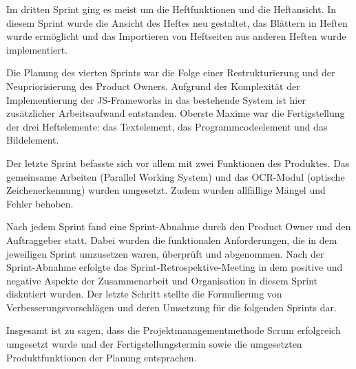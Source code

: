 
\newpage

Im dritten Sprint ging es meist um die Heftfunktionen und die Heftansicht. In diesem Sprint wurde die Ansicht des Heftes neu gestaltet, das Blättern in Heften wurde ermöglicht und das Importieren von Heftseiten aus anderen Heften wurde implementiert.


Die Planung des vierten Sprints war die Folge einer Restrukturierung und der Neupriorisierung des Product Owners. Aufgrund der Komplexität der Implementierung der JS-Frameworks in das bestehende System ist hier zusätzlicher Arbeitsaufwand entstanden. Oberste Maxime war die Fertigstellung der drei Heftelemente: das Textelement, das Programmcodeelement und das Bildelement.

Der letzte Sprint befasste sich vor allem mit zwei Funktionen des Produktes. Das gemeinsame Arbeiten (Parallel Working System) und das OCR-Modul (optische Zeichenerkennung) wurden umgesetzt. Zudem wurden allfällige Mängel und Fehler behoben.


\newpage

Nach jedem Sprint fand eine Sprint-Abnahme durch den Product Owner und den Auftraggeber statt. Dabei wurden die funktionalen Anforderungen, die in dem jeweiligen Sprint umzusetzen waren, überprüft und abgenommen. Nach der Sprint-Abnahme erfolgte das Sprint-Retrospektive-Meeting in dem positive und negative Aspekte der Zusammenarbeit und Organisation in diesem Sprint diskutiert wurden. Der letzte Schritt stellte die Formulierung von Verbesserungsvorschlägen und deren Umsetzung für die folgenden Sprints dar.

Insgesamt ist zu sagen, dass die Projektmanagementmethode Scrum erfolgreich umgesetzt wurde und der Fertigstellungstermin sowie die umgesetzten Produktfunktionen der Planung entsprachen.
